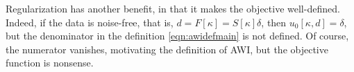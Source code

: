 Regularization has another benefit, in that it makes the objective
well-defined. Indeed, if the data is noise-free, that is,
$d=F[\kappa]=S[\kappa]\delta$, then $u_0[\kappa,d]=\delta$, but the
denominator in the definition \ref{eqn:awidefmain} is not defined.
Of course, the numerator vanishes, motivating the definition of AWI,
but the objective function is nonsense.




